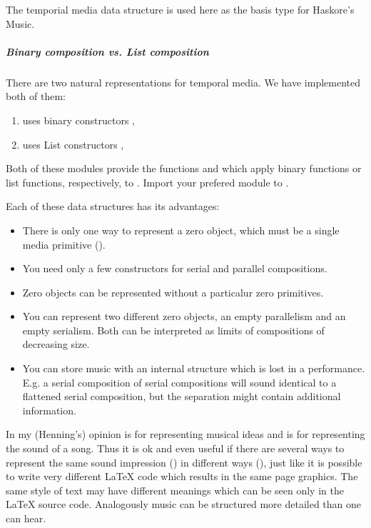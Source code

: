 The temporial media data structure 
is used here as the basis type for Haskore's Music.

\subparagraph*{Binary composition vs. List composition}

There are two natural representations for temporal media.
We have implemented both of them:
\begin{enumerate}
\item {} uses binary constructors \code{:+:}, \code{:=:}
\item {} uses List constructors , 
\end{enumerate}

Both of these modules provide
the functions  and 
which apply binary functions or list functions, respectively, to .
Import your prefered module to .

Each of these data structures has its advantages:

\begin{itemize}
\item There is only one way to represent a zero object,
which must be a single media primitive ().
\item You need only a few constructors for
serial and parallel compositions.
\end{itemize}

\begin{itemize}
\item
Zero objects can be represented without a particalur zero primitives.
\item
You can represent two different zero objects,
an empty parallelism and an empty serialism.
Both can be interpreted as limits of
compositions of decreasing size.
\item
You can store music with an internal structure
which is lost in a performance.
E.g. a serial composition of serial compositions
will sound identical to a flattened serial composition,
but the separation might contain additional information.
\end{itemize}

In my (Henning's) opinion
 is for representing musical ideas
and  is for representing the sound of a song.
Thus it is ok and even useful if there are several ways
to represent the same sound impression ()
in different ways (),
just like it is possible to write very different \LaTeX{} code
which results in the same page graphics.
The same style of text may have different meanings
which can be seen only in the \LaTeX{} source code.
Analogously music can be structured more detailed than one can hear.


